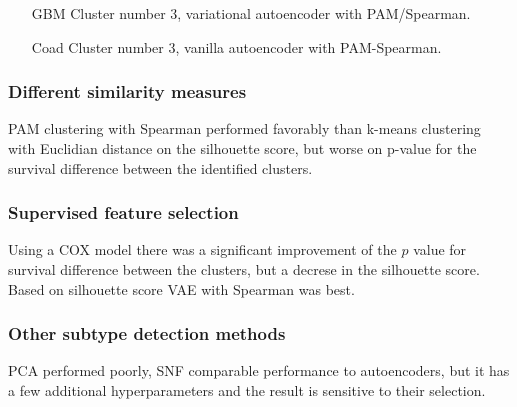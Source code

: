 		\begin{itemize}
			\item[GBM] Cluster number $3$, variational autoencoder with PAM/Spearman.
			\item[Coad] Cluster number $3$, vanilla autoencoder with PAM-Spearman.
		\end{itemize}

		\subsubsection{Different similarity measures}
		PAM clustering with Spearman performed favorably than k-means clustering with Euclidian distance on the silhouette score, but worse on p-value for the survival difference between the identified clusters.

		\subsubsection{Supervised feature selection}
		Using a COX model there was a significant improvement of the $p$ value for survival difference between the clusters, but a decrese in the silhouette score.
		Based on silhouette score VAE with Spearman was best.

		\subsubsection{Other subtype detection methods}
		PCA performed poorly, SNF comparable performance to autoencoders, but it has a few additional hyperparameters and the result is sensitive to their selection.
